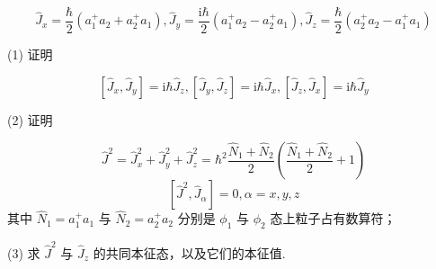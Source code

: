 $$
\hat {J} _ {x} = \dfrac {\hbar}{2} \left(a _ {1} ^ {+} a _ {2} + a _ {2} ^ {+} a _ {1}\right), \hat {J} _ {y} = \dfrac {\mathrm{i} \hbar}{2} \left(a _ {1} ^ {+} a _ {2} - a _ {2} ^ {+} a _ {1}\right), \hat {J} _ {z} = \dfrac {\hbar}{2} \left(a _ {2} ^ {+} a _ {2} - a _ {1} ^ {+} a _ {1}\right)
$$

(1) 证明

$$
\left[ \hat {J} _ {x}, \hat {J} _ {y} \right] = \mathrm{i} \hbar \hat {J} _ {z}, \left[ \hat {J} _ {y}, \hat {J} _ {z} \right] = \mathrm{i} \hbar \hat {J} _ {x}, \left[ \hat {J} _ {z}, \hat {J} _ {x} \right] = \mathrm{i} \hbar \hat {J} _ {y}
$$

(2) 证明

$$
\hat {J} ^ {2} = \hat {J} _ {x} ^ {2} + \hat {J} _ {y} ^ {2} + \hat {J} _ {z} ^ {2} = \hbar^ {2} \dfrac {\hat {N} _ {1} + \hat {N} _ {2}}{2} \left(\dfrac {\hat {N} _ {1} + \hat {N} _ {2}}{2} + 1\right)
$$
$$
\left[ \hat {J} ^ {2}, \hat {J} _ {\alpha} \right] = 0, \alpha = x, y, z
$$
其中 $\displaystyle \hat{N}_1 = a_1^+ a_1$ 与 $\displaystyle \hat{N}_2 = a_2^+ a_2$ 分别是 $\displaystyle \phi_1$ 与 $\displaystyle \phi_2$ 态上粒子占有数算符；

(3) 求 $\displaystyle \hat{J}^2$ 与 $\displaystyle \hat{J}_z$ 的共同本征态，以及它们的本征值.

\vfill

\newpage

